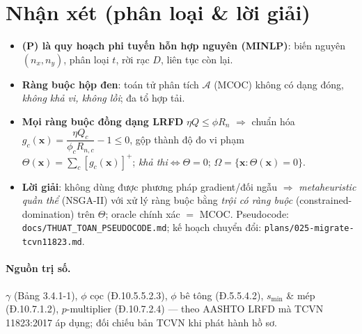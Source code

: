 \documentclass[11pt,a4paper]{article}
\newcommand{\Anl}{\boldsymbol{\mathcal{A}}}     %
\newcommand{\Feas}{\Omega}
\newcommand{\pos}[1]{\left[#1\right]^{+}}
\begin{document}
\section{Nhận xét (phân loại \& lời giải)}
\begin{itemize}
\item \textbf{(P) là quy hoạch phi tuyến hỗn hợp nguyên (MINLP)}: biến nguyên $(n_x,n_y)$,
phân loại $t$, rời rạc $D$, liên tục còn lại.
\item \textbf{Ràng buộc hộp đen}: toán tử phân tích $\Anl$ (MCOC) không có dạng đóng,
\emph{không khả vi, không lồi}; đa tổ hợp tải.
\item \textbf{Mọi ràng buộc đồng dạng LRFD} $\eta Q\le\phi R_n$ $\Rightarrow$ chuẩn hóa
$g_c(\mathbf{x})=\dfrac{\eta Q_c}{\phi_c R_{n,c}}-1\le0$, gộp thành độ đo vi phạm
$\Theta(\mathbf{x})=\sum_c\pos{g_c(\mathbf{x})}$; \emph{khả thi}$\iff\Theta=0$;
$\Feas=\{\mathbf{x}:\Theta(\mathbf{x})=0\}$.
\item \textbf{Lời giải}: không dùng được phương pháp gradient/đối ngẫu $\Rightarrow$
\emph{metaheuristic quần thể} (NSGA-II) với xử lý ràng buộc bằng \emph{trội có ràng buộc}
(constrained-domination) trên $\Theta$; oracle chính xác $=$ MCOC. Pseudocode:
\texttt{docs/THUAT\_TOAN\_PSEUDOCODE.md}; kế hoạch chuyển đổi: \texttt{plans/025-migrate-tcvn11823.md}.
\end{itemize}

\paragraph{Nguồn trị số.} $\gamma$ (Bảng 3.4.1-1), $\phi$ cọc (Đ.10.5.5.2.3), $\phi$ bê
tông (Đ.5.5.4.2), $s_{\min}$ \& mép (Đ.10.7.1.2), $p$-multiplier (Đ.10.7.2.4) --- theo
AASHTO LRFD mà TCVN 11823:2017 áp dụng; đối chiếu bản TCVN khi phát hành hồ sơ.
\end{document}
